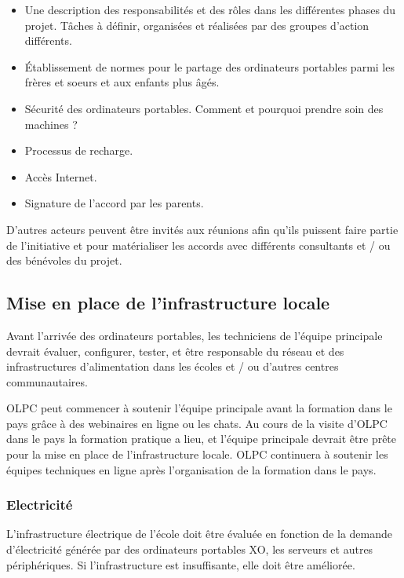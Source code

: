 \documentclass[11pt]{article}
\begin{document}
\begin{itemize}
\item Une description des responsabilités et des rôles dans les différentes
  phases du projet. Tâches à définir, organisées et réalisées par des
  groupes d'action différents.
\item Établissement de normes pour le partage des ordinateurs portables parmi
  les frères et soeurs et aux enfants plus âgés.
\item Sécurité des ordinateurs portables. Comment et pourquoi prendre soin des
  machines ?
\item Processus de recharge.
\item Accès Internet.
\item Signature de l'accord par les parents.
\end{itemize}

D'autres acteurs peuvent être invités aux réunions afin qu'ils puissent
faire partie de l'initiative et pour matérialiser les accords avec
différents consultants et / ou des bénévoles du projet.
\subsection{Mise en place de l'infrastructure locale}
\label{sec-9-4}



Avant l'arrivée des ordinateurs portables, les techniciens de l'équipe
principale devrait évaluer, configurer, tester, et être responsable du
réseau et des infrastructures d'alimentation dans les écoles et / ou
d'autres centres communautaires.

OLPC peut commencer à soutenir l'équipe principale avant la formation dans
le pays grâce à des webinaires en ligne ou les chats. Au cours de la visite
d'OLPC dans le pays la formation pratique a lieu, et l'équipe principale
devrait être prête pour la mise en place de l'infrastructure locale. OLPC
continuera à soutenir les équipes techniques en ligne après l'organisation
de la formation dans le pays.
\subsubsection{Electricité}
\label{sec-9-4-1}



L'infrastructure électrique de l'école doit être évaluée en fonction de la
demande d'électricité générée par des ordinateurs portables XO, les
serveurs et autres périphériques. Si l'infrastructure est insuffisante,
elle doit être améliorée.
\end{document}
